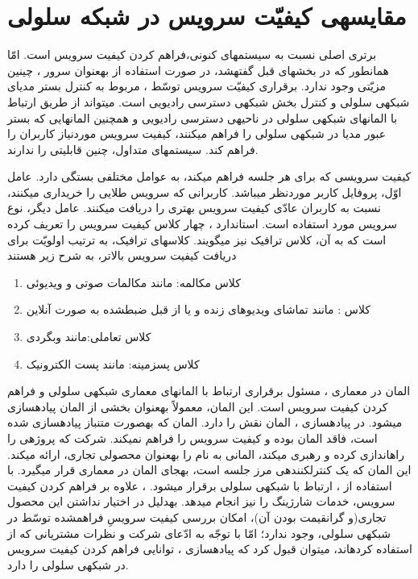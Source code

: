  

\section{مقایسه\nf ی کیفیّت سرویس در شبکه سلولی}

برتری اصلی  نسبت به سیستم\nf های  کنونی،فراهم کردن کیفیت سرویس است. امّا همانطور که در بخش\nf های قبل گفته\nf شد، در صورت استفاده از  به\nf عنوان سرور ، چینین مزیّتی وجود ندارد. برقراری کیفیّت سرویس توسّط ، مربوط به کنترل بستر مدیای شبکه\nf ی سلولی و کنترل بخش شبکه\nf ی دسترسی رادیویی است.  می\nf تواند از طریق ارتباط با المان\nf های شبکه\nf ی سلولی در ناحیه\nf ی دسترسی رادیویی و همچنین المان\nf هایی که بستر عبور مدیا در شبکه\nf ی سلولی را فراهم می\nf کنند، کیفیت سرویس موردنیاز کاربران را فراهم کند. سیستم\nf های  متداول، چنین قابلیتی را ندارند.

کیفیت سرویسی که  برای هر جلسه فراهم می\nf کند، به عوامل مختلفی بستگی دارد. عامل اوّل، پروفایل کاربر موردنظر می\nf باشد. کاربرانی که سرویس طلایی را خریداری می\nf کنند، نسبت به کاربران عادّی کیفیت سرویس بهتری را دریافت می\nf کنند. عامل دیگر، نوع سرویس مورد استفاده است. استاندارد ، چهار کلاس کیفیت سرویس را تعریف کرده است که به آن، کلاس ترافیک نیز می\nf گویند. کلاس\nf های ترافیک، به ترتیب اولویّت برای دریافت کیفیت سرویس بالاتر، به شرح زیر هستند\cite{blended}
\begin{enumerate}
\item کلاس مکالمه: مانند مکالمات صوتی و ویدیوئی
\item کلاس : مانند تماشای ویدیوهای زنده و یا از قبل ضبط\nf شده به صورت آنلاین
\item کلاس تعاملی:مانند وب\nf گردی
\item کلاس پس\nf زمینه: مانند پست الکترونیک
\end{enumerate}

المان  در معماری ، مسئول برقراری ارتباط با المان\nf های معماری شبکه\nf ی سلولی و فراهم کردن کیفیت سرویس است. این المان، معمولاً به\nf عنوان بخشی از المان  پیاده\nf سازی می\nf شود\cite{blended}. در پیاده\nf سازی ، المان  نقش  را دارد. المان  که به\nf صورت متن\nf باز پیاده\nf سازی شده است، فاقد المان  بوده و کیفیت سرویس را فراهم نمی\nf کند. شرکت  که پروژه\nf ی  را راه\nf اندازی کرده و رهبری می\nf کند، المانی به نام  را به\nf عنوان محصولی تجاری، ارائه می\nf کند. این المان که یک کنترل\nf کننده\nf ی مرز جلسه است، به\nf جای المان  در معماری  قرار می\nf گیرد. با استفاده از ، ارتباط  با شبکه\nf ی سلولی برقرار می\nf شود. ، علاوه بر فراهم کردن کیفیت سرویس، خدمات شارژینگ را نیز انجام می\nf دهد\cite{webperimeta}. به\nf دلیل در اختیار نداشتن این محصول تجاری(و گران\nf قیمت بودن آن)، امکان بررسی کیفیت سرویسِ فراهم\nf شده توسّط  در شبکه\nf ی سلولی، وجود ندارد؛ امّا با توجّه به ادّعای شرکت  و نظرات مشتریانی که از  استفاده کرده\nf اند، می\nf توان قبول کرد که پیاده\nf سازی ، توانایی فراهم کردن کیفیت سرویس در شبکه\nf ی سلولی را دارد.


